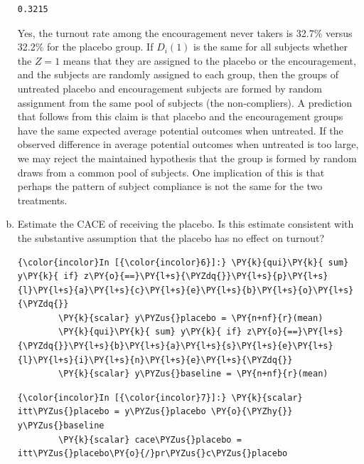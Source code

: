 \documentclass[11pt,notitlepage]{article}\usepackage[]{graphicx}\usepackage[]{color}
\makeatletter
\newenvironment{kframe}{%
 \def\at@end@of@kframe{}%
 \ifinner\ifhmode%
  \def\at@end@of@kframe{\end{minipage}}%
  \begin{minipage}{\columnwidth}%
 \fi\fi%
 \def\FrameCommand##1{\hskip\@totalleftmargin \hskip-\fboxsep
 \colorbox{shadecolor}{##1}\hskip-\fboxsep
     \hskip-\linewidth \hskip-\@totalleftmargin \hskip\columnwidth}%
 \MakeFramed {\advance\hsize-\width
   \@totalleftmargin\z@ \linewidth\hsize
   \@setminipage}}%
 {\par\unskip\endMakeFramed%
 \at@end@of@kframe}
\newenvironment{knitrout}{}{} %
\makeatother
\begin{document}
\begin{enumerate}[a)]
\begin{knitrout}
\begin{kframe}
    \begin{Verbatim}[commandchars=\\\{\}]
  0.3215
    \end{Verbatim}
\end{kframe}
\end{knitrout}
Yes, the turnout rate among the encouragement never takers is 32.7\% versus 32.2\% for the placebo group. If $D_i(1)$ is the same for all subjects whether the $Z=1$ means that they are assigned to the placebo or the encouragement, and the subjects are randomly assigned to each group, then the groups of untreated placebo and encouragement subjects are formed by random assignment from the same pool of subjects (the non-compliers). A prediction that follows from this claim is that placebo and the encouragement groups have the same expected average potential outcomes when untreated. If the observed difference in average potential outcomes when untreated is too large, we may reject the maintained hypothesis that the group is formed by random draws from a common pool of subjects. One implication of this is that perhaps the pattern of subject compliance is not the same for the two treatments.

\item Estimate the CACE of receiving the placebo. Is this estimate consistent with the substantive assumption that the placebo has no effect on turnout?\\
\begin{knitrout}
\color{fgcolor}\begin{kframe}
   \begin{Verbatim}[commandchars=\\\{\}]
{\color{incolor}In [{\color{incolor}6}]:} \PY{k}{qui}\PY{k}{ sum} y\PY{k}{ if} z\PY{o}{==}\PY{l+s}{\PYZdq{}}\PY{l+s}{p}\PY{l+s}{l}\PY{l+s}{a}\PY{l+s}{c}\PY{l+s}{e}\PY{l+s}{b}\PY{l+s}{o}\PY{l+s}{\PYZdq{}}
        \PY{k}{scalar} y\PYZus{}placebo = \PY{n+nf}{r}(mean)
        \PY{k}{qui}\PY{k}{ sum} y\PY{k}{ if} z\PY{o}{==}\PY{l+s}{\PYZdq{}}\PY{l+s}{b}\PY{l+s}{a}\PY{l+s}{s}\PY{l+s}{e}\PY{l+s}{l}\PY{l+s}{i}\PY{l+s}{n}\PY{l+s}{e}\PY{l+s}{\PYZdq{}}
        \PY{k}{scalar} y\PYZus{}baseline = \PY{n+nf}{r}(mean)
\end{Verbatim}

    \begin{Verbatim}[commandchars=\\\{\}]
{\color{incolor}In [{\color{incolor}7}]:} \PY{k}{scalar} itt\PYZus{}placebo = y\PYZus{}placebo \PY{o}{\PYZhy{}} y\PYZus{}baseline
        \PY{k}{scalar} cace\PYZus{}placebo = itt\PYZus{}placebo\PY{o}{/}pr\PYZus{}c\PYZus{}placebo
\end{Verbatim}


\end{kframe}
\end{knitrout}
\end{enumerate}
\end{document}
